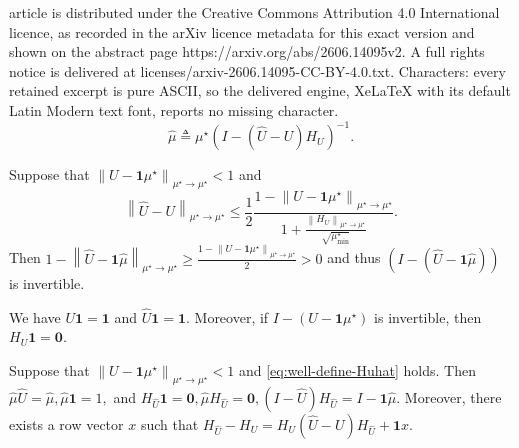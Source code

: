 \documentclass[10pt,a4paper]{amsart}
\def\ltwonorm#1{\left\lVert #1\right\rVert _{\mu^\star\to\mu^\star}}%
\newcommand{\muhat}{\widehat{\mu}}
\newcommand{\one}{\mathbf{1}}
\newcommand{\uhat}{\widehat{U}}
\newcommand{\zero}{\mathbf{0}}
\begin{document}
article is distributed under the Creative Commons Attribution 4.0 International licence, as recorded in the arXiv licence metadata for this exact version and shown on the abstract page https://arxiv.org/abs/2606.14095v2. A full rights notice is delivered at licenses/arxiv-2606.14095-CC-BY-4.0.txt. Characters: every retained excerpt is pure ASCII, so the delivered engine, XeLaTeX with its default Latin Modern text font, reports no missing character.
\begin{equation}
    \muhat\triangleq \mu^\star (I - (\uhat-U)H_U)^{-1}.
    \label{eq:muhat-definition}
\end{equation} 

\begin{lemma}
\label{lem:well-define-Huhat}
    Suppose that $\ltwonorm{U - \one \mu^\star} < 1$ and 
    \begin{equation}
        \ltwonorm{ \uhat-U} \leq \frac{1}{2}\frac{1 - \ltwonorm{U - \one \mu^\star}}{1 + \frac{\ltwonorm{H_{U}}}{\sqrt{\mu^\star_{\min}}} }. \label{eq:well-define-Huhat}
    \end{equation}
    Then
    $
        1-\ltwonorm{\uhat - \one \muhat} \geq \frac{1-\ltwonorm{U - \one \mu^\star}}{2} > 0
    $
    and thus $(I - (\uhat - \one \muhat))$ is invertible.
\end{lemma}

\begin{lemma}
\label{lem:basic-U-HU-identities}
We have \(U\one=\one\) and \(\uhat\one=\one\). Moreover, if
\(I-(U-\one\mu^\star)\) is invertible, then \(H_U\one=\zero\).
\end{lemma}

\begin{lemma}
\label{lem:perturbed-Uhat-Huhat-identities}
Suppose that \(\ltwonorm{U-\one\mu^\star}<1\) and
\eqref{eq:well-define-Huhat} holds. Then
\(
    \muhat\uhat=\muhat,
    \muhat\one=1,
\) and
\(
    H_{\uhat}\one=\zero,
    \muhat H_{\uhat}=\zero,
    (I-\uhat)H_{\uhat}=I-\one\muhat.
\)
Moreover, there exists a row vector \(x\) such that
\(
    H_{\uhat}-H_U
    =
    H_U(\uhat-U)H_{\uhat}+\one x.
\)
\end{lemma}
\end{document}
